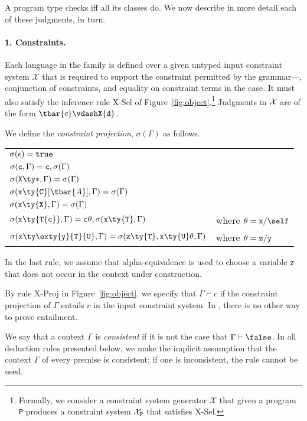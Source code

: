 A program type checks iff all its classes do. We now describe in more detail each of these judgments, in turn. 


\paragraph{1. Constraints.}
Each language in the  family is defined over a given untyped input constraint system $\mathcal{X}$ that is required to support the constraint permitted by the  grammar---\true{}, conjunction of constraints, and equality on constraint terms in the \FXGL{\cdot} case. It must also satisfy the inference rule {\sc X-Sel} of Figure~\ref{fig:object}.\footnote{Formally, we consider a constraint system generator $\mathcal{X}$ that given a program {\tt P} produces a constraint system $\mathcal{X}_{\tt P}$ that satisfies {\sc X-Sel}.} Judgments in $\cal X$ are of the form $\tbar{c} \vdashX {\tt d}$.

We define the {\em constraint projection}, $\sigma(\Gamma)$ as follows.
%
\begin{center}
\begin{tabular}{ll}
$\sigma(\epsilon)={\tt true}$\\
$\sigma({\tt c},\Gamma) = {\tt c}, \sigma(\Gamma)$\\
$\sigma({\tt X}\ty*, \Gamma)=\sigma(\Gamma)$\\
$\sigma({\tt x}\ty{\tt C}[\tbar{A}], \Gamma)=\sigma(\Gamma)$\\
$\sigma({\tt x}\ty{\tt X}, \Gamma)=\sigma(\Gamma)$\\
$\sigma({\tt x}\ty{\tt T\{c\}}, \Gamma)={\tt c}\theta,\sigma({\tt x}\ty{\tt T},\Gamma)$ & where $\theta={\tt x}/\self$\\
$\sigma({\tt x}\ty\exty{{\tt y}}{{\tt T}}{{\tt U}}, \Gamma)=\sigma({\tt z}\ty{\tt T}, {\tt x}\ty{\tt U}\theta,\Gamma)$ & where $\theta={\tt z}/{\tt y}$\\
\end{tabular}
\end{center}
%
In the last rule, we assume that alpha-equivalence is used to choose a variable {\tt z} that does not occur in the context under construction.

By rule {\sc X-Proj} in Figure~\ref{fig:object}, we specify that $\Gamma\vdash c$ if the constraint projection of $\Gamma$ entails $c$ in the input constraint system. In \FXGL{\cdot}, there is no other way to prove entailment.

We say that a context $\Gamma$ is {\em consistent} if it is not the case that $\Gamma\vdash\false$.
In all deduction rules presented below, we make the implicit assumption that the context $\Gamma$ of every premise is consistent; if one is inconsistent, the rule cannot be used.

